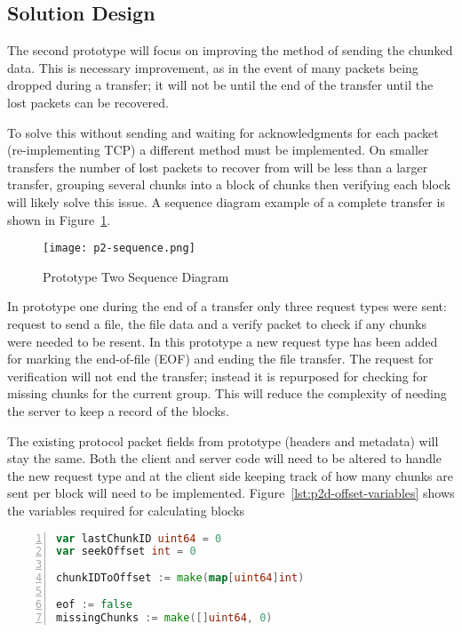 \subsection*{Solution Design}
The second prototype will focus on improving the method of sending the chunked data. This is necessary improvement, as in the event of many packets being dropped during a transfer; it will not be until the end of the transfer until the lost packets can be recovered.

To solve this without sending and waiting for acknowledgments for each packet (re-implementing TCP) a different method must be implemented. On smaller transfers the number of lost packets to recover from will be less than a larger transfer, grouping several chunks into a block of chunks then verifying each block will likely solve this issue. A sequence diagram example of a complete transfer is shown in Figure~\ref{fig:p2-sequence}.

\newpage
\begin{figure}[h!]
    \centering
    \texttt{[image: p2-sequence.png]}
    \caption{Prototype Two Sequence Diagram}
    \label{fig:p2-sequence}
\end{figure}
\newpage

In prototype one during the end of a transfer only three request types were sent: request to send a file, the file data and a verify packet to check if any chunks were needed to be resent. In this prototype a new request type has been added for marking the end-of-file (EOF) and ending the file transfer. The request for verification will not end the transfer; instead it is repurposed for checking for missing chunks for the current group. This will reduce the complexity of needing the server to keep a record of the blocks.

The existing protocol packet fields from prototype (headers and metadata) will stay the same. Both the client and server code will need to be altered to handle the new request type and at the client side keeping track of how many chunks are sent per block will need to be implemented. Figure~\ref{lst:p2d-offset-variables} shows the variables required for calculating blocks

\begin{lstlisting}[caption={Prototype Two Offset Variables},label=lst:p2d-offset-variables,breaklines,numbers=left,language=go]
var lastChunkID uint64 = 0
var seekOffset int = 0

chunkIDToOffset := make(map[uint64]int)

eof := false
missingChunks := make([]uint64, 0)
\end{lstlisting}


